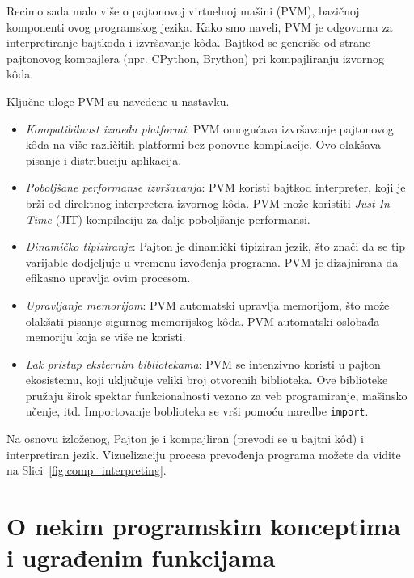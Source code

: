 
Recimo sada malo više o pajtonovoj virtuelnoj mašini (PVM), bazičnoj komponenti ovog programskog jezika. Kako smo naveli, PVM je odgovorna za interpretiranje bajtkoda i izvršavanje k\^oda. Bajtkod se generiše od strane pajtonovog kompajlera (npr. CPython, Brython) pri kompajliranju izvornog k\^oda.

Ključne uloge PVM su navedene u nastavku. 
\begin{itemize}
\item \textit{Kompatibilnost između platformi}: PVM omogućava izvršavanje pajtonovog k\^oda na više različitih platformi bez ponovne kompilacije. Ovo olakšava pisanje i distribuciju aplikacija.
\item \textit{Poboljšane performanse izvršavanja}: PVM koristi bajtkod  interpreter, koji je brži od direktnog interpretera izvornog k\^oda. PVM može koristiti \textit{Just-In-Time} (JIT) kompilaciju za dalje poboljšanje performansi.
\item \textit{Dinamičko tipiziranje}: Pajton je dinamički tipiziran jezik, što znači da se tip varijable dodjeljuje u vremenu izvođenja programa. PVM je dizajnirana da efikasno upravlja ovim procesom.
\item  \textit{Upravljanje memorijom}: PVM automatski upravlja memorijom, što može olakšati pisanje sigurnog memorijskog k\^oda. PVM  automatski oslobađa memoriju koja se više ne koristi.
\item \textit{Lak pristup eksternim bibliotekama}: PVM se intenzivno koristi u pajton ekosistemu, koji uključuje veliki broj otvorenih biblioteka. Ove biblioteke pružaju širok spektar funkcionalnosti vezano za  veb programiranje, mašinsko učenje, itd. Importovanje boblioteka se vrši pomoću naredbe \texttt{import}. 
\end{itemize}


Na osnovu izloženog, Pajton je i kompajliran (prevodi se u bajtni k\^od) i interpretiran jezik. 
Vizuelizaciju procesa prevođenja programa možete da vidite na Slici~\ref{fig:comp_interpreting}.


\section{O nekim programskim konceptima i ugrađenim funkcijama} \label{sec:concepts-pyhton}

